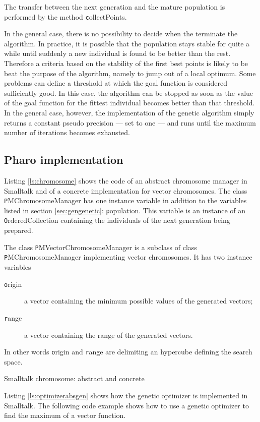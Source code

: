 \noindent The transfer between the next generation and the mature
population is performed by the method {\texttt collectPoints}.

In the general case, there is no possibility to decide when the
terminate the algorithm. In practice, it is possible that the
population stays stable for quite a while until suddenly a new
individual is found to be better than the rest. Therefore a
criteria based on the stability of the first best points is likely
to be beat the purpose of the algorithm, namely to jump out of a
local optimum. Some problems can define a threshold at which the
goal function is considered sufficiently good. In this case, the
algorithm can be stopped as soon as the value of the goal function
for the fittest individual becomes better than that threshold. In
the general case, however, the implementation of the genetic
algorithm simply returns a constant pseudo precision
--- set to one --- and runs until the maximum number of iterations
becomes exhausted.

\subsection{Pharo implementation}
Listing \ref{ls:chromosome} shows the code of an abstract chromosome manager in
Smalltalk and of a concrete implementation for vector chromosomes. The class
{\texttt PMChromosomeManager} has one instance variable in addition
to the variables listed in section \ref{sec:gengenetic}: {\texttt
population}. This variable is an instance of an {\texttt
OrderedCollection} containing the individuals of the next
generation being prepared.

The class {\texttt PMVectorChromosomeManager} is a subclass of class
{\texttt PMChromosomeManager} implementing vector chromosomes. It has
two instance variables
\begin{description}
  \item[\texttt origin] a vector containing the minimum possible
  values of the generated vectors;
  \item[\texttt range] a vector containing the range of the generated
  vectors.
\end{description}
In other words {\texttt origin} and {\texttt range} are delimiting an
hypercube defining the search space.

\begin{listing} Smalltalk chromosome: abstract and concrete \label{ls:chromosome}


\end{listing}
Listing \ref{ls:optimizerabsgen} shows how the genetic optimizer
is implemented in Smalltalk. The following code example shows how
to use a genetic optimizer to find the maximum of a vector
function.

